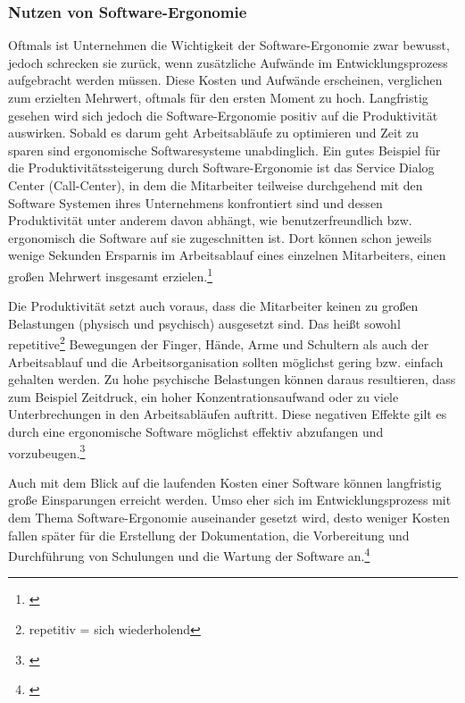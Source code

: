 
\subsubsection{Nutzen von Software-Ergonomie}
Oftmals ist Unternehmen die Wichtigkeit der Software-Ergonomie zwar bewusst, jedoch schrecken sie zurück, wenn zusätzliche Aufwände im Entwicklungsprozess aufgebracht werden müssen. Diese Kosten und Aufwände erscheinen, verglichen zum erzielten Mehrwert, oftmals für den ersten Moment zu hoch. Langfristig gesehen wird sich jedoch die Software-Ergonomie positiv auf die Produktivität auswirken. Sobald es darum geht Arbeitsabläufe zu optimieren und Zeit zu sparen sind ergonomische Softwaresysteme unabdinglich. Ein gutes Beispiel für die Produktivitätssteigerung durch Software-Ergonomie ist das Service Dialog Center (Call-Center), in dem die Mitarbeiter teilweise durchgehend mit den Software Systemen ihres Unternehmens konfrontiert sind und dessen Produktivität unter anderem davon abhängt, wie benutzerfreundlich bzw. ergonomisch die Software auf sie zugeschnitten ist. Dort können schon jeweils wenige Sekunden Ersparnis im Arbeitsablauf eines einzelnen Mitarbeiters, einen großen Mehrwert insgesamt erzielen.\footnote{\cite[vgl.][19]{Pruemper_Harten2007}}

Die Produktivität setzt auch voraus, dass die Mitarbeiter keinen zu großen Belastungen (physisch und psychisch) ausgesetzt sind. Das heißt sowohl repetitive\footnote{repetitiv = sich wiederholend} Bewegungen der Finger, Hände, Arme und Schultern als auch der Arbeitsablauf und die Arbeitsorganisation sollten möglichst gering bzw. einfach gehalten werden. Zu hohe psychische Belastungen können daraus resultieren, dass zum Beispiel Zeitdruck, ein hoher Konzentrationsaufwand oder zu viele Unterbrechungen in den Arbeitsabläufen auftritt. Diese negativen Effekte gilt es durch eine ergonomische Software möglichst effektiv abzufangen und vorzubeugen.\footnote{\cite[vgl.][19]{Pruemper_Harten2007}}

Auch mit dem Blick auf die laufenden Kosten einer Software können langfristig große Einsparungen erreicht werden. Umso eher sich im Entwicklungsprozess mit dem Thema Software-Ergonomie auseinander gesetzt wird, desto weniger Kosten fallen später für die Erstellung der Dokumentation, die Vorbereitung und Durchführung von Schulungen und die Wartung der Software an.\footnote{\cite[vgl.][19]{Pruemper_Harten2007}}

